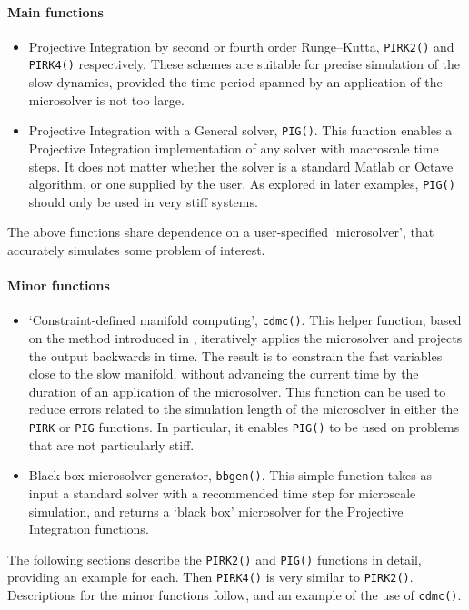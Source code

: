 \begin{body}
\paragraph{Main functions}
\begin{itemize}
\item Projective Integration by second or fourth order Runge--Kutta, \verb|PIRK2()| and \verb|PIRK4()| respectively.
These schemes are suitable for precise simulation of the slow dynamics, provided the time period spanned by an application of the microsolver is not too large.
\item Projective Integration with a General solver, \verb|PIG()|.
This function enables a Projective Integration implementation of any solver with macroscale time steps.
It does not matter whether the solver is a standard Matlab or Octave algorithm, or one supplied by the user.
As explored in later examples, \verb|PIG()| should only be used in very stiff systems. 
\end{itemize}
The above functions share dependence on a user-specified `microsolver', that accurately simulates some problem of interest. 
\paragraph{Minor functions}
\begin{itemize}
\item `Constraint-defined manifold computing', \verb|cdmc()|.
This helper function, based on the method introduced in \cite{GearKevrekidis05},  iteratively applies the microsolver and projects the output backwards in time.
The result is to constrain the fast variables close to the slow manifold, without advancing the current time by the duration of an application of the microsolver.
This function can be used to reduce errors related to the simulation length of the microsolver in either the \verb|PIRK| or \verb|PIG| functions.
In particular, it enables \verb|PIG()| to be used on problems that are not particularly stiff.
\item Black box microsolver generator, \verb|bbgen()|.
This simple function takes as input a standard solver with a recommended time step for microscale simulation, and returns a `black box' microsolver for the Projective Integration functions.
\end{itemize}

The following sections describe the \verb|PIRK2()| and \verb|PIG()| functions in detail, providing an example for each.
Then \verb|PIRK4()| is very similar to \verb|PIRK2()|.
Descriptions for the minor functions follow, and an example of the use of \verb|cdmc()|.

\end{body}


